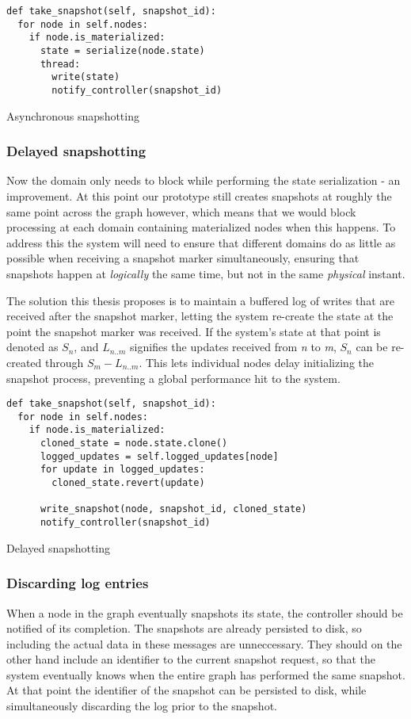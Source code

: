 \documentclass[b5paper]{report}
\begin{document}
\begin{listing}[H]
  \begin{verbatim}
def take_snapshot(self, snapshot_id):
  for node in self.nodes:
    if node.is_materialized:
      state = serialize(node.state)
      thread:
        write(state)
        notify_controller(snapshot_id)
  \end{verbatim}
  \caption{Asynchronous snapshotting}
\end{listing}

\subsubsection{Delayed snapshotting}
Now the domain only needs to block while performing the state serialization - an
improvement. At this point our prototype still creates snapshots at roughly the
same point across the graph however, which means that we would block processing
at each domain containing materialized nodes when this happens. To address this
the system will need to ensure that different domains do as little as possible
when receiving a snapshot marker simultaneously, ensuring that snapshots happen
at \textit{logically} the same time, but not in the same \textit{physical}
instant.

The solution this thesis proposes is to maintain a buffered log of writes that
are received after the snapshot marker, letting the system re-create the state
at the point the snapshot marker was received. If the system's state at that
point is denoted as $ S_n $, and $ L_{n..m} $ signifies the updates received
from \textit{n} to \textit{m}, $ S_n $ can be re-created through
$ S_m - L_{n..m} $. This lets individual nodes delay initializing the snapshot
process, preventing a global performance hit to the system.

\begin{listing}[H]
  \begin{verbatim}
def take_snapshot(self, snapshot_id):
  for node in self.nodes:
    if node.is_materialized:
      cloned_state = node.state.clone()
      logged_updates = self.logged_updates[node]
      for update in logged_updates:
        cloned_state.revert(update)

      write_snapshot(node, snapshot_id, cloned_state)
      notify_controller(snapshot_id)
  \end{verbatim}
  \caption{Delayed snapshotting}
\end{listing}

\subsubsection{Discarding log entries}
When a node in the graph eventually snapshots its state, the controller should
be notified of its completion. The snapshots are already persisted to disk, so
including the actual data in these messages are unneccessary. They should on the
other hand include an identifier to the current snapshot request, so that the
system eventually knows when the entire graph has performed the same snapshot.
At that point the identifier of the snapshot can be persisted to disk, while
simultaneously discarding the log prior to the snapshot.
\end{document}
